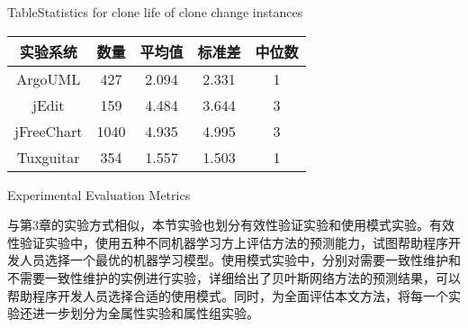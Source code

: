 \begin{table}[htbp]
{Table$\!$}{Statistics for clone life of clone change instances}
\vspace{0.5em}
\centering
\wuhao
\begin{tabular}{ccccc}
\toprule[1.5pt]
{实验系统}&{数量}&{平均值}&{标准差}&{中位数}\\ 
\midrule[1pt]
ArgoUML&427&2.094&2.331&1\\ 
jEdit&159&4.484&3.644&3\\ 
jFreeChart&1040&4.935&4.995&3\\ 
Tuxguitar&354&1.557&1.503&1\\ 
\bottomrule[1.5pt]
\end{tabular}
\end{table}



{Experimental Evaluation Metrics}
\label{ref-changingmetrics}

与第3章的实验方式相似，本节实验也划分有效性验证实验和使用模式实验。有效性验证实验中，使用五种不同机器学习方上评估方法的预测能力，试图帮助程序开发人员选择一个最优的机器学习模型。使用模式实验中，分别对需要一致性维护和不需要一致性维护的实例进行实验，详细给出了贝叶斯网络方法的预测结果，可以帮助程序开发人员选择合适的使用模式。同时，为全面评估本文方法，将每一个实验还进一步划分为全属性实验和属性组实验。

